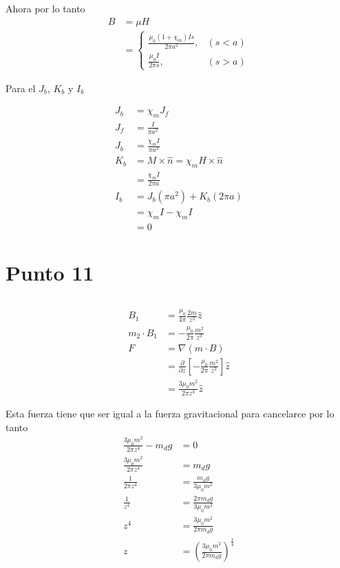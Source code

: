\documentclass{report}
\begin{document}
Ahora por lo tanto
\begin{align*}
  B &= \mu H\\
  &= \begin{cases}
    \frac{\mu_0(1 + \chi_m)Is}{2\pi a^2}, & (s < a)\\
    \frac{\mu_0 I}{2\pi s}, & (s > a)
  \end{cases}
\end{align*}

Para el $J_b$, $K_b$ y $I_b$

\begin{align*}
  J_b &= \chi_m J_f\\
  J_f &= \frac{I}{\pi a^2}\\
  J_b &= \frac{\chi_m I}{\pi a^2}\\
  K_b &= M \times \hat{n} = \chi_m H \times \hat{n}\\
  &= \frac{\chi_m I}{2\pi a}\\
  I_b &= J_b(\pi a^2) + K_b(2\pi a)\\
  &= \chi_m I - \chi_m I\\
  &= 0
\end{align*}

\chapter{Punto 11}

\section{}

\begin{align*}
  B_1 &= \frac{\mu_0}{4\pi} \frac{2m}{z^3}\hat{z}\\
  m_2\cdot B_1 &= - \frac{\mu_0}{2\pi}\frac{m^2}{z^3}\\
  F &= \nabla (m\cdot B)\\
  &= \frac{\partial}{\partial z}\left[ - \frac{\mu_0}{2\pi}\frac{m^2}{z^3} \right] \hat{z}\\
  &= \frac{3\mu_0 m^2}{2\pi z^4}\hat{z}
\end{align*}

Esta fuerza tiene que ser igual a la fuerza gravitacional para cancelarce por lo tanto
\begin{align*}
  \frac{3\mu_0 m^2}{2\pi z^4} - m_d g &= 0\\
  \frac{3\mu_0 m^2}{2\pi z^4} &= m_d g\\
  \frac{1}{2\pi z^4} &= \frac{m_d g}{3\mu_0 m^2}\\
  \frac{1}{z^4} &= \frac{2\pi m_d g}{3\mu_0 m^2}\\
  z^4 &= \frac{3\mu_0 m^2}{2\pi m_d g}\\
  z &= \left(\frac{3\mu_0 m^2}{2\pi m_d g}\right)^{\frac{1}{4}}\\
\end{align*}
\end{document}
